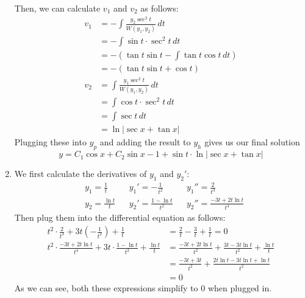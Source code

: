 \documentclass[12pt]{article}
\begin{document}
\begin{enumerate}
          Then, we can calculate $v_1$ and $v_2$ as follows:
          \begin{align*}
              v_1 & =-\int \frac{y_2 \sec^2 t}{W(y_1, y_2)}\,dt           \\
                  & =-\int \sin t \cdot \sec^2 t\,dt                      \\
                  & =-\left(\tan t \sin t - \int \tan t \cos t\,dt\right) \\
                  & =-\left(\tan t \sin t + \cos t\right)                 \\
              v_2 & = \int \frac{y_1 \sec^2 t}{W(y_1, y_2)}\,dt           \\
                  & = \int \cos t \cdot \sec^2 t\,dt                      \\
                  & = \int \sec t\,dt                                     \\
                  & =\ln |\sec x + \tan x|
          \end{align*}
          Plugging these into $y_p$ and adding the result to $y_h$ gives us our final solution
          \[y=C_1 \cos x + C_2 \sin x-1+\sin t \cdot \ln |\sec x + \tan x|\]
    \item We first calculate the derivatives of $y_1$ and $y_2'$:
          \begin{align*}
               & y_1=\frac{1}{t}     &  & y_1'=-\frac{1}{t^2}        &  & y_1''=\frac{2}{t^3}           \\
               & y_2=\frac{\ln t}{t} &  & y_2'=\frac{1 - \ln t}{t^2} &  & y_2''=\frac{-3t+2t\ln t}{t^4}
          \end{align*}
          Then plug them into the differential equation as follows:
          \begin{align*}
              t^2 \cdot \frac{2}{t^3} + 3t\left(-\frac{1}{t^2}\right) + \frac{1}{t}              & = \frac{2}{t}-\frac{3}{t}+\frac{1}{t}=0                          \\
              t^2 \cdot \frac{-3t+2t\ln t}{t^4} + 3t \cdot \frac{1-\ln t}{t^2} + \frac{\ln t}{t} & = \frac{-3t+2t\ln t}{t^2}+\frac{3t-3t\ln t}{t^2}+\frac{\ln t}{t} \\
                                                                                                 & = \frac{-3t+3t}{t^2}+\frac{2t\ln t-3t\ln t+\ln t}{t^2}           \\
                                                                                                 & = 0
          \end{align*}
          As we can see, both these expressions simplify to $0$ when plugged in.


\end{enumerate}
\end{document}
